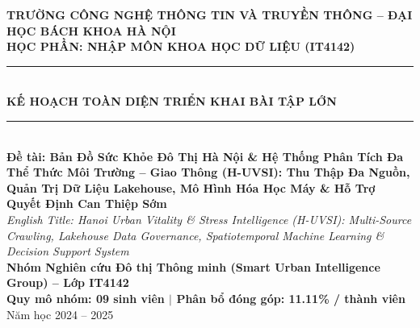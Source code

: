 \documentclass[11pt,a4paper]{article}
\begin{document}
\begin{center}
    {\large \textbf{TRƯỜNG CÔNG NGHỆ THÔNG TIN VÀ TRUYỀN THÔNG -- ĐẠI HỌC BÁCH KHOA HÀ NỘI}}\\[0.2cm]
    {\normalsize \textbf{HỌC PHẦN: NHẬP MÔN KHOA HỌC DỮ LIỆU (IT4142)}}\\[0.5cm]
    
    \rule{\textwidth}{1.2pt}\\[0.35cm]
    {\LARGE \textbf{KẾ HOẠCH TOÀN DIỆN TRIỂN KHAI BÀI TẬP LỚN}}\\[0.3cm]
    \rule{\textwidth}{1.2pt}\\[0.4cm]
    
    {\large \textbf{Đề tài: Bản Đồ Sức Khỏe Đô Thị Hà Nội \& Hệ Thống Phân Tích Đa Thể Thức Môi Trường -- Giao Thông (H-UVSI): Thu Thập Đa Nguồn, Quản Trị Dữ Liệu Lakehouse, Mô Hình Hóa Học Máy \& Hỗ Trợ Quyết Định Can Thiệp Sớm}}\\[0.3cm]
    
    \textit{English Title: Hanoi Urban Vitality \& Stress Intelligence (H-UVSI): Multi-Source Crawling, Lakehouse Data Governance, Spatiotemporal Machine Learning \& Decision Support System}\\[0.45cm]
    
    \textbf{Nhóm Nghiên cứu Đô thị Thông minh (Smart Urban Intelligence Group) -- Lớp IT4142}\\
    \textbf{Quy mô nhóm: 09 sinh viên \quad $\vert$ \quad Phân bổ đóng góp: 11.11\% / thành viên}\\[0.2cm]
    Năm học 2024 -- 2025
\end{center}

\vspace{0.2cm}
\end{document}
